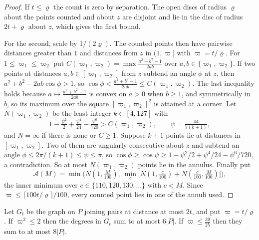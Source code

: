 \documentclass[11pt,colorlinks]{charlie}
\begin{document}
\begin{proof}
If $t\le\varrho$ the count is zero by separation. The open discs of radius $\varrho$ about the points counted and about $z$ are disjoint and lie in the disc of radius $2t+\varrho$ about $z$, which gives the first bound.

For the second, scale by $1/(2\varrho)$. The counted points then have pairwise distances greater than $1$ and distances from $z$ in $(1,\varpi]$ with $\varpi=t/\varrho$. For $1\le\varpi_1\le\varpi_2$ put $C(\varpi_1,\varpi_2)=\max\frac{a^2+b^2-1}{2ab}$ over $a,b\in\{\varpi_1,\varpi_2\}$. If two points at distances $a,b\in[\varpi_1,\varpi_2]$ from $z$ subtend an angle $\phi$ at $z$, then $a^2+b^2-2ab\cos\phi>1$, so $\cos\phi<\frac{a^2+b^2-1}{2ab}\le C(\varpi_1,\varpi_2)$. The last inequality holds because $a\mapsto\frac{a^2+b^2-1}{2ab}$ is convex on $a>0$ when $b\ge1$, and symmetrically in $b$, so its maximum over the square $[\varpi_1,\varpi_2]^2$ is attained at a corner. Let $N(\varpi_1,\varpi_2)$ be the least integer $k\in[4,127]$ with
\[
 1-\tfrac{\psi^2}{2}+\tfrac{\psi^4}{24}-\tfrac{\psi^6}{720}>C(\varpi_1,\varpi_2),\qquad \psi=\tfrac{44}{7(k+1)},
\]
and $N=\infty$ if there is none or $C\ge1$. Suppose $k+1$ points lie at distances in $[\varpi_1,\varpi_2]$. Two of them are angularly consecutive about $z$ and subtend an angle $\phi\le2\pi/(k+1)\le\psi\le\pi$, so $\cos\phi\ge\cos\psi\ge1-\psi^2/2+\psi^4/24-\psi^6/720$, a contradiction. So at most $N(\varpi_1,\varpi_2)$ points lie in the annulus. Finally put
\[
 \mathcal A(M)=\min\Big(N(1,\tfrac M{100}),\ \min_{c}\big[N(1,\tfrac c{100})+N(\tfrac c{100},\tfrac M{100})\big]\Big),
\]
the inner minimum over $c\in\{110,120,130,\dots\}$ with $c<M$. Since $\varpi\le\lceil100t/\varrho\rceil/100$, every counted point lies in one of the annuli used.
\end{proof}

\begin{lemma}\label{lem:average}
Let $G_t$ be the graph on $P$ joining pairs at distance at most $2t$, and put $\varpi=t/\varrho$. If $\varpi^2\le2$ then the degrees in $G_t$ sum to at most $6|P|$. If $\varpi\le\tfrac{39}{25}$ then they sum to at most $8|P|$.
\end{lemma}
\end{document}
